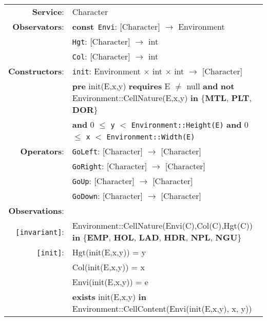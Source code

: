 \documentclass[7pt]{article}
\begin{document}
\begin{tabular}{rl}
\textbf{Service}: & \textrm{Character}  \\
\textbf{Observators}: & \textbf{const}~\texttt{Envi}: \textrm{[Character]} $\rightarrow$ \textrm{Environment}  \\
 & \texttt{Hgt}: \textrm{[Character]} $\rightarrow$ \textrm{int}  \\
 & \texttt{Col}: \textrm{[Character]} $\rightarrow$ \textrm{int}  \\
 
\textbf{Constructors}: & \texttt{init}: \textrm{Environment} $\times$ \textrm{int} $\times$ \textrm{int} $\rightarrow$ \textrm{[Character]} \\
& \quad\textbf{pre} \textrm{init(E,x,y)} \textbf{requires} E $\neq$ null \textbf{and} \textbf{not} \textrm{Environment::CellNature(E,x,y)} \textbf{in} \{\textbf{MTL}, \textbf{PLT}, \textbf{DOR}\} \\
& \quad\quad\quad \textbf{and} 0 $\leq$ \texttt{y} $<$ \texttt{Environment::Height(E)} \textbf{and} 0 $\leq$ \texttt{x} $<$ \texttt{Environment::Width(E)} \\

\textbf{Operators}: 
& \texttt{GoLeft}: \textrm{[Character]} $\rightarrow$ \textrm{[Character]} \\
 & \texttt{GoRight}: \textrm{[Character]} $\rightarrow$ \textrm{[Character]} \\
 & \texttt{GoUp}: \textrm{[Character]} $\rightarrow$ \textrm{[Character]} \\
 & \texttt{GoDown}: \textrm{[Character]} $\rightarrow$ \textrm{[Character]} \\

\textbf{Observations}: \\
\texttt{[invariant]}: & \textrm{Environment::CellNature(Envi(C),Col(C),Hgt(C))} \textbf{in} \{\textbf{EMP}, \textbf{HOL}, \textbf{LAD}, \textbf{HDR}, \textbf{NPL}, \textbf{NGU}\} \\
\texttt{[init]}: & Hgt(init(E,x,y)) = y\\
& Col(init(E,x,y)) = x\\
& Envi(init(E,x,y)) = e\\
& \textbf{exists} init(E,x,y) \textbf{in} Environment::CellContent(Envi(init(E,x,y), x, y)) \\


\end{tabular}
\end{document}
